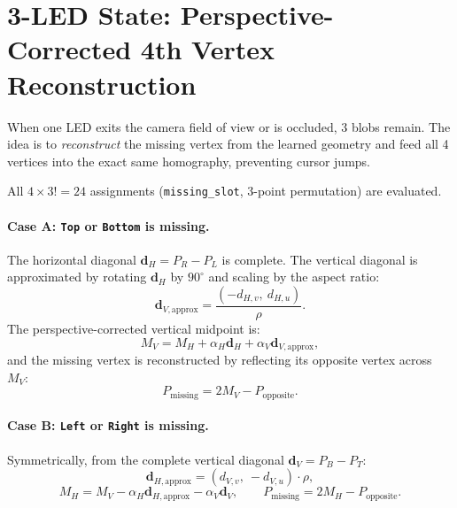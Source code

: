 \documentclass[11pt,a4paper]{article}
\newcommand{\vect}[1]{\mathbf{#1}}
\newcommand{\code}[1]{\texttt{#1}}
\begin{document}
\section{3-LED State: Perspective-Corrected 4th Vertex Reconstruction}
\label{sec:three}

When one LED exits the camera field of view or is occluded, 3 blobs remain. The
idea is to \emph{reconstruct} the missing vertex from the learned geometry and
feed all 4 vertices into the exact same homography, preventing cursor jumps.

All $4 \times 3! = 24$ assignments (\code{missing\_slot}, 3-point permutation)
are evaluated.

\paragraph{Case A: \code{Top} or \code{Bottom} is missing.}
The horizontal diagonal $\vect{d}_H = P_R - P_L$ is complete. The vertical
diagonal is approximated by rotating $\vect{d}_H$ by $90^\circ$ and scaling by
the aspect ratio:
\begin{equation}
  \vect{d}_{V,\text{approx}} = \frac{(-d_{H,v},\ d_{H,u})}{\rho}.
\end{equation}
The perspective-corrected vertical midpoint is:
\begin{equation}
  M_V = M_H + \alpha_H \vect{d}_H + \alpha_V \vect{d}_{V,\text{approx}},
\end{equation}
and the missing vertex is reconstructed by reflecting its opposite vertex across
$M_V$:
\begin{equation}
  P_{\text{missing}} = 2 M_V - P_{\text{opposite}} .
\end{equation}

\paragraph{Case B: \code{Left} or \code{Right} is missing.}
Symmetrically, from the complete vertical diagonal $\vect{d}_V = P_B - P_T$:
\begin{equation}
  \vect{d}_{H,\text{approx}} = (d_{V,v},\ -d_{V,u})\cdot\rho ,
\end{equation}
\begin{equation}
  M_H = M_V - \alpha_H \vect{d}_{H,\text{approx}} - \alpha_V \vect{d}_V,
  \qquad
  P_{\text{missing}} = 2 M_H - P_{\text{opposite}} .
\end{equation}
\end{document}
